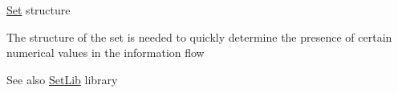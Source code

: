 \mbox{\hyperlink{struct_set}{Set}} structure

The structure of the set is needed to quickly determine the presence of certain numerical values in the information flow \begin{DoxySeeAlso}{See also}
{\ttfamily \mbox{\hyperlink{group___set_lib}{Set\+Lib}}} library 
\end{DoxySeeAlso}
